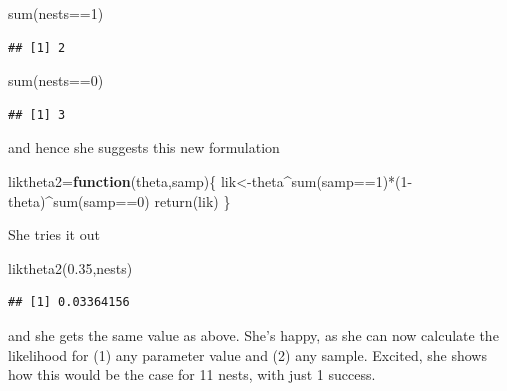 \documentclass[
]{book}
\newenvironment{Shaded}{\begin{snugshade}}{\end{snugshade}}
\newcommand{\ControlFlowTok}[1]{\textcolor[rgb]{0.13,0.29,0.53}{\textbf{#1}}}
\newcommand{\DecValTok}[1]{\textcolor[rgb]{0.00,0.00,0.81}{#1}}
\newcommand{\FloatTok}[1]{\textcolor[rgb]{0.00,0.00,0.81}{#1}}
\newcommand{\FunctionTok}[1]{\textcolor[rgb]{0.00,0.00,0.00}{#1}}
\newcommand{\NormalTok}[1]{#1}
\newcommand{\OtherTok}[1]{\textcolor[rgb]{0.56,0.35,0.01}{#1}}
\newcommand{\SpecialCharTok}[1]{\textcolor[rgb]{0.00,0.00,0.00}{#1}}
\begin{document}
\begin{Shaded}
\begin{Highlighting}[]
\FunctionTok{sum}\NormalTok{(nests}\SpecialCharTok{==}\DecValTok{1}\NormalTok{)}
\end{Highlighting}
\end{Shaded}

\begin{verbatim}
## [1] 2
\end{verbatim}

\begin{Shaded}
\begin{Highlighting}[]
\FunctionTok{sum}\NormalTok{(nests}\SpecialCharTok{==}\DecValTok{0}\NormalTok{)}
\end{Highlighting}
\end{Shaded}

\begin{verbatim}
## [1] 3
\end{verbatim}

and hence she suggests this new formulation

\begin{Shaded}
\begin{Highlighting}[]
\NormalTok{liktheta2}\OtherTok{=}\ControlFlowTok{function}\NormalTok{(theta,samp)\{}
\NormalTok{  lik}\OtherTok{\textless{}{-}}\NormalTok{theta}\SpecialCharTok{\^{}}\FunctionTok{sum}\NormalTok{(samp}\SpecialCharTok{==}\DecValTok{1}\NormalTok{)}\SpecialCharTok{*}\NormalTok{(}\DecValTok{1}\SpecialCharTok{{-}}\NormalTok{theta)}\SpecialCharTok{\^{}}\FunctionTok{sum}\NormalTok{(samp}\SpecialCharTok{==}\DecValTok{0}\NormalTok{)}
  \FunctionTok{return}\NormalTok{(lik)}
\NormalTok{\}}
\end{Highlighting}
\end{Shaded}

She tries it out

\begin{Shaded}
\begin{Highlighting}[]
\FunctionTok{liktheta2}\NormalTok{(}\FloatTok{0.35}\NormalTok{,nests)}
\end{Highlighting}
\end{Shaded}

\begin{verbatim}
## [1] 0.03364156
\end{verbatim}

and she gets the same value as above. She's happy, as she can now calculate the likelihood for (1) any parameter value and (2) any sample. Excited, she shows how this would be the case for 11 nests, with just 1 success.
\end{document}
